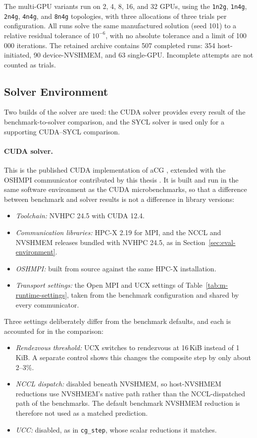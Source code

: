 The multi-GPU variants run on 2, 4, 8, 16, and 32 GPUs, using the \texttt{1n2g}, \texttt{1n4g}, \texttt{2n4g}, \texttt{4n4g}, and \texttt{8n4g} topologies, with three allocations of three trials per configuration. All runs solve the same manufactured solution (seed 101) to a relative residual tolerance of $10^{-6}$, with no absolute tolerance and a limit of 100\,000 iterations. The retained archive contains 507 completed runs: 354 host-initiated, 90 device-NVSHMEM, and 63 single-GPU. Incomplete attempts are not counted as trials.

\subsection{Solver Environment}\label{sec:acg-environment}

Two builds of the solver are used: the CUDA solver provides every result of the benchmark-to-solver comparison, and the SYCL solver is used only for a supporting CUDA--SYCL comparison.

\paragraph{CUDA solver.} This is the published CUDA implementation of aCG \cite{trotter_cpu-_2025}, extended with the OSHMPI communicator contributed by this thesis \cite{merenda_acg_oshmpi_2026}. It is built and run in the same software environment as the CUDA microbenchmarks, so that a difference between benchmark and solver results is not a difference in library versions:
\begin{itemize}
    \item \emph{Toolchain:} NVHPC 24.5 with CUDA 12.4.
    \item \emph{Communication libraries:} HPC-X 2.19 for MPI, and the NCCL and NVSHMEM releases bundled with NVHPC 24.5, as in Section~\ref{sec:eval-environment}.
    \item \emph{OSHMPI:} built from source against the same HPC-X installation.
    \item \emph{Transport settings:} the Open MPI and UCX settings of Table~\ref{tab:m-runtime-settings}, taken from the benchmark configuration and shared by every communicator.
\end{itemize}
Three settings deliberately differ from the benchmark defaults, and each is accounted for in the comparison:
\begin{itemize}
    \item \emph{Rendezvous threshold:} UCX switches to rendezvous at 16\,KiB instead of 1\,KiB. A separate control shows this changes the composite step by only about 2--3\%.
    \item \emph{NCCL dispatch:} disabled beneath NVSHMEM, so host-NVSHMEM reductions use NVSHMEM's native path rather than the NCCL-dispatched path of the benchmarks. The default benchmark NVSHMEM reduction is therefore not used as a matched prediction.
    \item \emph{UCC:} disabled, as in \texttt{cg\_step}, whose scalar reductions it matches.
\end{itemize}

